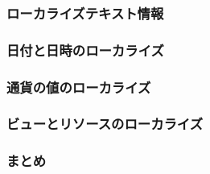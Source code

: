 
\subsubsection{ローカライズテキスト情報}

\subsubsection{日付と日時のローカライズ}

\subsubsection{通貨の値のローカライズ}

\subsubsection{ビューとリソースのローカライズ}

\subsubsection{まとめ}

